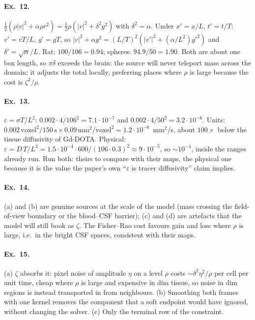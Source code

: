 \documentclass[11pt]{article}
\newcommand{\eps}{\varepsilon}
\newcounter{ex}
\begin{document}
\paragraph{Ex.\ 12.} $\tfrac12(\rho|v|^2+\alpha\rho r^2)=\tfrac12\rho(|v|^2+\delta^2g^2)$ with
$\delta^2=\alpha$. Under $x'=x/L$, $t'=t/T$: $v'=vT/L$, $g'=gT$, so
$|v|^2+\alpha g^2=(L/T)^2(|v'|^2+(\alpha/L^2)g'^2)$ and $\delta'=\sqrt\alpha/L$. Rat:
$100/106=0.94$; spheres: $94.9/50=1.90$. Both are about one box length, so $\pi\delta$
exceeds the brain: the source will never teleport mass across the domain; it adjusts the
total locally, preferring places where $\rho$ is large because the cost is $\zeta^2/\rho$.

\paragraph{Ex.\ 13.} $\eps=\sigma T/L^2$: $0.002\cdot4/106^2=7.1\cdot10^{-7}$ and
$0.002\cdot4/50^2=3.2\cdot10^{-6}$. Units: $0.002\,\text{voxel}^2/150\,\text{s}\times0.09\,\text{mm}^2/\text{voxel}^2=1.2\cdot10^{-6}$~mm$^2$/s,
about $100\times$ below the tissue diffusivity of Gd-DOTA. Physical:
$\eps=D\,T/L^2=1.5\cdot10^{-4}\cdot600/(106\cdot0.3)^2\approx9\cdot10^{-5}$, so $\sim10^{-4}$,
inside the ranges already run. Run both: theirs to compare with their maps, the physical
one because it is the value the paper's own ``$\eps$ is tracer diffusivity'' claim implies.

\paragraph{Ex.\ 14.} (a) and (b) are genuine sources at the scale of the model (mass crossing
the field-of-view boundary or the blood--CSF barrier); (c) and (d) are artefacts that the
model will still book as $\zeta$. The Fisher--Rao cost favours gain and loss where $\rho$ is
large, i.e.\ in the bright CSF spaces, consistent with their maps.

\paragraph{Ex.\ 15.} (a) $\zeta$ absorbs it: pixel noise of amplitude $\eta$ on a level $\rho$
costs $\sim\delta^2\eta^2/\rho$ per cell per unit time, cheap where $\rho$ is large and
expensive in dim tissue, so noise in dim regions is instead transported in from neighbours.
(b) Smoothing both frames with one kernel removes the component that a soft endpoint would
have ignored, without changing the solver. (c) Only the terminal row of the constraint.
\end{document}
